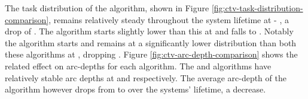 The task distribution of the \algorithmDistribution{}{} algorithm, shown in Figure 	\ref{fig:ctv-task-distribution-comparison}, remains relatively steady throughout the system lifetime at \resultsTaskDistDistStart{}{} - \resultsTaskDistDistEnd{}{}, a drop of \resultsTaskDistDistPercent{}{}. The \algorithmQuality{}{} algorithm starts slightly lower than this at \resultsTaskDistQualityStart{}{} and falls \resultsTaskDistQualityPercent{}{} to \resultsTaskDistQualityEnd{}{}. Notably the \algorithmEnergy{}{} algorithm starts and remains at a significantly lower distribution than both these algorithms at \resultsTaskDistEnergyEnd{}{}, dropping \resultsTaskDistEnergydPercent{}{}. Figure
\ref{fig:ctv-arc-depth-comparison} shows the related effect on arc-depths for each algorithm. The \algorithmQuality{}{} and \algorithmDistribution{}{} algorithms have relatively stable arc depths at \resultsArcDepthQualityEnd{}{} and \resultsArcDepthDistEnd{}{} respectively. The average arc-depth of the \algorithmEnergy{}{} algorithm however drops from \resultsArcDepthEnergyStart{}{} to  \resultsArcDepthEnergyEnd{}{} over the systems' lifetime, a \resultsArcDepthEnergyPercent{}{} decrease.

